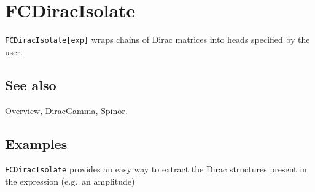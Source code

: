 \documentclass[../FeynCalcManual.tex]{subfiles}
\begin{document}
\hypertarget{fcdiracisolate}{
\section{FCDiracIsolate}\label{fcdiracisolate}}

\texttt{FCDiracIsolate[\allowbreak{}exp]} wraps chains of Dirac matrices
into heads specified by the user.

\subsection{See also}

\hyperlink{toc}{Overview}, \hyperlink{diracgamma}{DiracGamma},
\hyperlink{spinor}{Spinor}.

\subsection{Examples}

\texttt{FCDiracIsolate} provides an easy way to extract the Dirac
structures present in the expression (e.g.~an amplitude)
\end{document}
